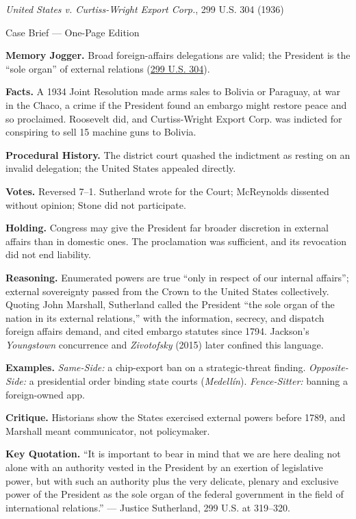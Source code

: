 \documentclass[12pt]{article}
\begin{document}
\begin{center}
{\Large \textit{United States v. Curtiss-Wright Export Corp.}, 299 U.S. 304 (1936)\par}
\vspace{0.3em}
{\normalsize Case Brief --- One-Page Edition\par}
\end{center}

\textbf{Memory Jogger.} Broad foreign-affairs delegations are valid; the President is the ``sole organ'' of external relations (\href{https://supreme.justia.com/cases/federal/us/299/304/}{299 U.S. 304}).

\textbf{Facts.} A 1934 Joint Resolution made arms sales to Bolivia or Paraguay, at war in the Chaco, a crime if the President found an embargo might restore peace and so proclaimed. Roosevelt did, and Curtiss-Wright Export Corp. was indicted for conspiring to sell 15 machine guns to Bolivia.

\textbf{Procedural History.} The district court quashed the indictment as resting on an invalid delegation; the United States appealed directly.

\textbf{Votes.} Reversed 7--1. Sutherland wrote for the Court; McReynolds dissented without opinion; Stone did not participate.

\textbf{Holding.} Congress may give the President far broader discretion in external affairs than in domestic ones. The proclamation was sufficient, and its revocation did not end liability.

\textbf{Reasoning.} Enumerated powers are true ``only in respect of our internal affairs''; external sovereignty passed from the Crown to the United States collectively. Quoting John Marshall, Sutherland called the President ``the sole organ of the nation in its external relations,'' with the information, secrecy, and dispatch foreign affairs demand, and cited embargo statutes since 1794. Jackson's \textit{Youngstown} concurrence and \textit{Zivotofsky} (2015) later confined this language.

\textbf{Examples.} \emph{Same-Side:} a chip-export ban on a strategic-threat finding. \emph{Opposite-Side:} a presidential order binding state courts (\textit{Medell\'in}). \emph{Fence-Sitter:} banning a foreign-owned app.

\textbf{Critique.} Historians show the States exercised external powers before 1789, and Marshall meant communicator, not policymaker.

\textbf{Key Quotation.} ``It is important to bear in mind that we are here dealing not alone with an authority vested in the President by an exertion of legislative power, but with such an authority plus the very delicate, plenary and exclusive power of the President as the sole organ of the federal government in the field of international relations.'' --- Justice Sutherland, 299 U.S. at 319--320.
\end{document}
